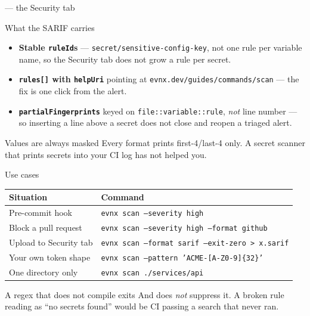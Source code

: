 \begin{frame}[fragile]{ — the Security tab}
\end{frame}

\begin{frame}{What the SARIF carries}
  \begin{itemize}
    \item \textbf{Stable \texttt{ruleId}s} — \texttt{secret/sensitive-config-key},
          not one rule per variable name, so the Security tab does not grow a
          rule per secret.
    \item \textbf{\texttt{rules[]} with \texttt{helpUri}} pointing at
          \texttt{evnx.dev/guides/commands/scan} — the fix is one click from
          the alert.
    \item \textbf{\texttt{partialFingerprints}} keyed on
          \texttt{file::variable::rule}, \emph{not} line number — so inserting a
          line above a secret does not close and reopen a triaged alert.
  \end{itemize}

  \vspace{0.6em}
  \begin{block}{Values are always masked}
    Every format prints first-4/last-4 only. A secret scanner that prints
    secrets into your CI log has not helped you.
  \end{block}
\end{frame}

\begin{frame}{Use cases}
  \begin{tabular}{@{}p{}p{}@{}}
    \toprule
    \textbf{Situation} & \textbf{Command} \\
    \midrule
    Pre-commit hook & \texttt{evnx scan --severity high} \\
    Block a pull request & \texttt{evnx scan --severity high --format github} \\
    Upload to Security tab & \texttt{evnx scan --format sarif --exit-zero > x.sarif} \\
    Your own token shape & \texttt{evnx scan --pattern 'ACME-[A-Z0-9]\{32\}'} \\
    One directory only & \texttt{evnx scan ./services/api} \\
    \bottomrule
  \end{tabular}

  \vspace{0.8em}
  \begin{alertblock}{A regex that does not compile exits \exittwo}
    And  does \emph{not} suppress it. A broken rule reading as
    ``no secrets found'' would be CI passing a search that never ran.
  \end{alertblock}
\end{frame}
